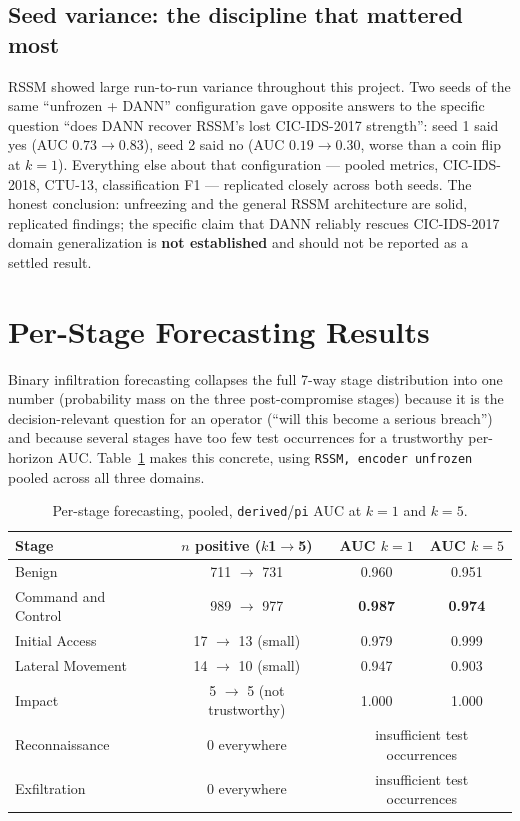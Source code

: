 \documentclass[11pt]{article}
\newcommand{\code}[1]{\texttt{#1}}
\begin{document}
\subsection{Seed variance: the discipline that mattered most}
\label{sec:seedvariance}

RSSM showed large run-to-run variance throughout this project. Two seeds of the same
``unfrozen + DANN'' configuration gave opposite answers to the specific question ``does DANN
recover RSSM's lost CIC-IDS-2017 strength'': seed 1 said yes (AUC $0.73\to0.83$), seed 2 said no
(AUC $0.19\to0.30$, worse than a coin flip at $k{=}1$). Everything else about that configuration
--- pooled metrics, CIC-IDS-2018, CTU-13, classification F1 --- replicated closely across both
seeds. The honest conclusion: unfreezing and the general RSSM architecture are solid, replicated
findings; the specific claim that DANN reliably rescues CIC-IDS-2017 domain generalization is
\textbf{not established} and should not be reported as a settled result.

\section{Per-Stage Forecasting Results}\label{sec:pstage}

Binary infiltration forecasting collapses the full 7-way stage distribution into one number
(probability mass on the three post-compromise stages) because it is the decision-relevant
question for an operator (``will this become a serious breach'') and because several stages have
too few test occurrences for a trustworthy per-horizon AUC. Table~\ref{tab:perstage} makes this
concrete, using \code{RSSM, encoder unfrozen} pooled across all three domains.

\begin{table}[htbp]
\centering
\caption{Per-stage forecasting, pooled, \code{derived}/\code{pi} AUC at $k{=}1$ and $k{=}5$.}
\label{tab:perstage}
\small
\begin{tabular}{lccc}
\toprule
\textbf{Stage} & \textbf{$n$ positive ($k$1$\to$5)} & \textbf{AUC $k{=}1$} & \textbf{AUC $k{=}5$} \\
\midrule
Benign                & 711 $\to$ 731 & 0.960 & 0.951 \\
Command and Control   & 989 $\to$ 977 & \textbf{0.987} & \textbf{0.974} \\
Initial Access        & 17 $\to$ 13 (small) & 0.979 & 0.999 \\
Lateral Movement      & 14 $\to$ 10 (small) & 0.947 & 0.903 \\
Impact                & 5 $\to$ 5 (not trustworthy) & 1.000 & 1.000 \\
Reconnaissance        & 0 everywhere & \multicolumn{2}{c}{insufficient test occurrences} \\
Exfiltration          & 0 everywhere & \multicolumn{2}{c}{insufficient test occurrences} \\
\bottomrule
\end{tabular}
\end{table}
\end{document}
